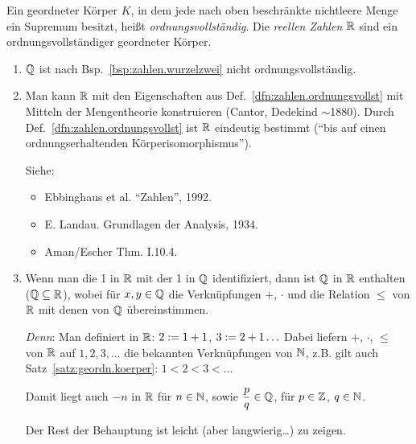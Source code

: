 \documentclass[12pt]{scrreprt}
\begin{document}
\begin{dfn}\label{dfn:zahlen.ordnungsvollst}
Ein geordneter Körper $K$, in dem jede nach oben beschränkte nichtleere Menge ein Supremum besitzt, heißt \textit{ordnungsvollständig}. Die \textit{reellen Zahlen $\mathbb{R}$} sind ein ordnungsvollständiger geordneter Körper.

\begin{bem*}
\begin{enumerate}%
\item $\mathbb{Q}$ ist nach Bsp.~\ref{bsp:zahlen.wurzelzwei} nicht ordnungsvollständig.

\item Man kann $\mathbb{R}$ mit den Eigenschaften aus Def.~\ref{dfn:zahlen.ordnungsvollst} mit Mitteln der Mengentheorie konstruieren (Cantor, Dedekind $\sim$1880). Durch Def.~\ref{dfn:zahlen.ordnungsvollst} ist $\mathbb{R}$ eindeutig bestimmt ("`bis auf einen ordnungserhaltenden Körperisomorphismus"').

Siehe:\begin{itemize}\item Ebbinghaus et al. "`Zahlen"', 1992.
\item E. Landau. Grundlagen der Analysis, 1934.
\item Aman/Escher Thm. I.10.4.
\end{itemize}

\item Wenn man die 1 in $\mathbb{R}$ mit der 1 in $\mathbb{Q}$ identifiziert, dann ist $\mathbb{Q}$ in $\mathbb{R}$ enthalten ($\mathbb{Q} \subseteq \mathbb{R}$), wobei für $x,y\in\mathbb{Q}$ die Verknüpfungen $+$, $\cdot$ und die Relation $\leq$ von $\mathbb{R}$ mit denen von $\mathbb{Q}$ übereinstimmen.

\textit{Denn}: Man definiert in $\mathbb{R}$: $2:= 1+1$, $3:= 2+1\ldots$ Dabei liefern $+$, $\cdot$, $\leq$ von $\mathbb{R}$ auf $1,2,3,\ldots$ die bekannten Verknüpfungen von $\mathbb{N}$, z.B. gilt auch Satz~\ref{satz:geordn.koerper}: $1<2<3<\ldots$

Damit liegt auch $-n$ in $\mathbb{R}$ für $n\in\mathbb{N}$, sowie $\displaystyle\frac{p}{q}\in\mathbb{Q}$, für $p\in\mathbb{Z}$, $q\in\mathbb{N}$.

Der Rest der Behauptung ist leicht (aber langwierig\ldots) zu zeigen.
\end{enumerate}
\end{bem*}
\end{dfn}

\end{document}
